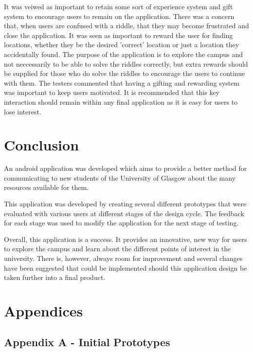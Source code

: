 \documentclass[10pt,twocolumn]{article} %
\begin{document}
It was veiwed as important to retain some sort of experience system and gift system to encourage users to remain on the application. There was a concern that, when users are confused with a riddle, that they may become frustrated and close the application. It was seen as important to reward the user for finding locations, whether they be the desired 'correct' location or just a location they accidentally found. The purpose of the application is to explore the campus and not neccessarily to be able to solve the riddles correctly, but extra rewards should be supplied for those who do solve the riddles to encourage the users to continue with them. The testers commented that having a gifting and rewarding system was important to keep users motivated. It is recommended that this key interaction should remain within any final application as it is easy for users to lose interest.

\section*{Conclusion}
An android application was developed which aims to provide a better method for communicating to new students of the University of Glasgow about the many resources available for them.

This application was developed by creating several different prototypes that were evaluated with various users at different stages of the design cycle. The feedback for each stage was used to modify the application for the next stage of testing. 

Overall, this application is a success. It provides an innovative, new way for users to explore the campus and learn about the different points of interest in the university. There is, however, always room for improvement and several changes have been suggested that could be implemented should this application design be taken further into a final product.

\onecolumn
\section*{Appendices}
\subsection*{Appendix A - Initial Prototypes}
\end{document}
